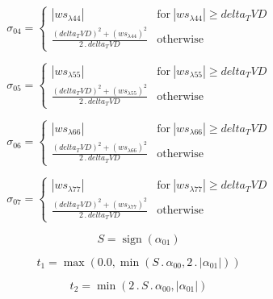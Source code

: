 \documentclass{article}
\begin{document}
\begin{dmath}\sigma_{0 4} = \begin{cases} \left|{ws_{\lambda 44}}\right| & \text{for}\: \left|{ws_{\lambda 44}}\right| \geq delta_TVD \\\frac{\left(delta_TVD \right)^{2} + \left(ws_{\lambda 44} \right)^{2}}{2 \,.\, delta_TVD} & \text{otherwise} 
\end{cases}\end{dmath}

\begin{dmath}\sigma_{0 5} = \begin{cases} \left|{ws_{\lambda 55}}\right| & \text{for}\: \left|{ws_{\lambda 55}}\right| \geq delta_TVD \\\frac{\left(delta_TVD \right)^{2} + \left(ws_{\lambda 55} \right)^{2}}{2 \,.\, delta_TVD} & \text{otherwise} 
\end{cases}\end{dmath}

\begin{dmath}\sigma_{0 6} = \begin{cases} \left|{ws_{\lambda 66}}\right| & \text{for}\: \left|{ws_{\lambda 66}}\right| \geq delta_TVD \\\frac{\left(delta_TVD \right)^{2} + \left(ws_{\lambda 66} \right)^{2}}{2 \,.\, delta_TVD} & \text{otherwise} 
\end{cases}\end{dmath}

\begin{dmath}\sigma_{0 7} = \begin{cases} \left|{ws_{\lambda 77}}\right| & \text{for}\: \left|{ws_{\lambda 77}}\right| \geq delta_TVD \\\frac{\left(delta_TVD \right)^{2} + \left(ws_{\lambda 77} \right)^{2}}{2 \,.\, delta_TVD} & \text{otherwise} 
\end{cases}\end{dmath}

\begin{dmath}S = \operatorname{sign}{\left (\alpha_{01} \right )}\end{dmath}

\begin{dmath}t_{1} = \max\left(0.0, \min\left(S \,.\, \alpha_{00}, 2 \,.\, \left|{\alpha_{01}}\right|\right)\right)\end{dmath}

\begin{dmath}t_{2} = \min\left(2 \,.\, S \,.\, \alpha_{00}, \left|{\alpha_{01}}\right|\right)\end{dmath}
\end{document}
